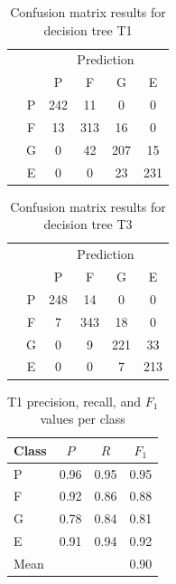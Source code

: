 \begin{table}%
	\centering
	\caption{Confusion matrix results for decision tree T1}
	\label{tab:t1:confusion}
	\small
	\begin{tabular}{cccccc}
		& 		& \multicolumn{4}{c}{Prediction}\\ 
		\cline{3-6}
		&   	& P  	& F     & G  	& E 	\\
		\cline{2-6}
		\parbox[t]{2mm}{}  
		& P 	& 242 	& 11 	& 0     & 0    	\\
		& F 	& 13 	& 313   & 16    & 0    	\\
		& G 	& 0 	& 42    & 207   & 15   	\\
		& E 	& 0 	& 0     & 23    & 231	\\ 
	\end{tabular}
\end{table}

\begin{table}%
	\centering
	\caption{Confusion matrix results for decision tree T3}
	\label{tab:t3:confusion}
	\small
	\begin{tabular}{cccccc}
		& 		& \multicolumn{4}{c}{Prediction}\\ 
		\cline{3-6}
		&   	& P  	& F     & G  	& E 	\\
		\cline{2-6}
		\parbox[t]{2mm}{\multirow{4}{*}{\rotatebox[origin=c]{90}{Actual}}}  
		& P 	& 248 	& 14 	& 0     & 0    	\\
		& F 	& 7 	& 343   & 18    & 0    	\\
		& G 	& 0 	& 9 	& 221   & 33   	\\
		& E 	& 0 	& 0     & 7    	& 213	\\ 
		\cline{2-6}
	\end{tabular}
\end{table}

\begin{table}
	\centering
	\caption{T1 precision, recall, and $F_1$ values per class}
	\label{tab:t1:f1}
	\small
	\begin{tabular}{lccc}
	Class   & $P$	& $R$  	& $F_1$ \\ 
	\hline
	P 		& 0.96 	& 0.95 	& 0.95 	\\
	F 		& 0.92 	& 0.86 	& 0.88 	\\
	G 		& 0.78 	& 0.84 	& 0.81 	\\
	E 		& 0.91 	& 0.94 	& 0.92 	\\
	\hline
	Mean 	&		&		& 0.90	\\
	\end{tabular}
\end{table}

